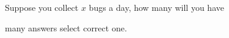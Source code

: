 \documentclass{ximera}
\author{Bart Snapp}
\begin{document}
\maketitle


\begin{exercise}
  Suppose you collect $x$ bugs a day, how many will you have

  many answers select correct one.
\end{exercise}
\vfill

\begin{exercise}
\end{exercise}
\vfill


\begin{exercise}
\end{exercise}
\vfill


\begin{exercise}
\end{exercise}
\vfill

\begin{exercise}
  
\end{exercise}
\vfill

\end{document}
